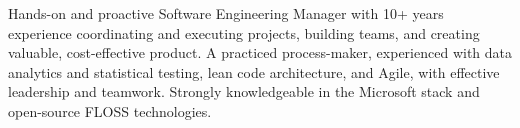 \documentclass[9pt]{developercv} %
\begin{document}
\vspace{0.5cm}



\begin{minipage}[t]{0.4\textwidth} %
	\vspace{-\baselineskip} %
	
Hands-on and proactive Software Engineering Manager with 10+ years experience coordinating and executing projects, building teams, and creating valuable, cost-effective product. A practiced process-maker, experienced with data analytics and statistical testing, lean code architecture, and Agile, with effective leadership and teamwork. Strongly knowledgeable in the Microsoft stack and open-source FLOSS technologies.
\end{minipage}
\hfill %
\begin{minipage}[t]{0.5\textwidth} %
	\vspace{-\baselineskip} %
	\begin{barchart}{5.5}
	\end{barchart}
\end{minipage}


\def\innerradius{1.2cm}
\def\outerradius{1.6cm}
\end{document}
